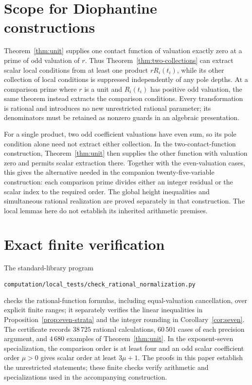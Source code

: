 \documentclass[11pt,a4paper]{article}
\begin{document}
\section{Scope for Diophantine constructions}

Theorem~\ref{thm:unit} supplies one contact function of valuation exactly
zero at a prime of odd valuation of $r$. Thus
Theorem~\ref{thm:two-collections} can extract scalar local conditions
from at least one product $rR_i(t_i)$, while its other collection of
local conditions is suppressed independently of any pole depths.
At a comparison prime where $r$ is a unit and $R_i(t_i)$ has positive
odd valuation, the same theorem instead extracts the comparison
conditions. Every transformation is rational and introduces no new
unrestricted rational parameter; its denominators must be retained
as nonzero guards in an algebraic presentation.

For a single product, two odd coefficient valuations have even sum,
so its pole condition alone need not extract either collection.
In the two-contact-function construction, Theorem~\ref{thm:unit}
then supplies the other function with valuation zero and permits
scalar extraction there. Together with the even-valuation cases,
this gives the alternative needed in the companion twenty-five-variable
construction: each comparison prime divides either an integer
residual or the scalar index to the required order. The global
height inequalities and simultaneous rational realization are proved
separately in that construction. The local lemmas here do not
establish its inherited arithmetic premises.
\section*{Exact finite verification}

The standard-library program
\begin{center}\small
\nolinkurl{computation/local_tests/check_rational_normalization.py}
\end{center}
checks the rational-function formulas, including equal-valuation
cancellation, over explicit finite ranges; it separately verifies the
linear inequalities in Proposition~\ref{prop:even-strata} and the integer
rounding in Corollary~\ref{cor:seven}. The certificate records
$38\,725$ rational calculations, $60\,501$ cases of each precision
argument, and $4\,680$ examples of Theorem~\ref{thm:unit}. In the
exponent-seven specialization, the comparison order is at least four
and an odd scalar coefficient order $\mu>0$ gives scalar order at least
$3\mu+1$. The proofs in this paper establish the
unrestricted statements; these finite checks verify arithmetic and
specializations used in the accompanying construction.
\end{document}
